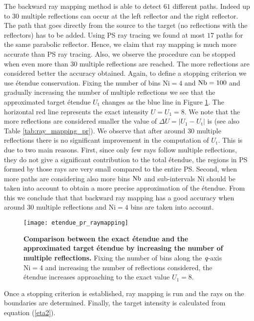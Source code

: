 The backward ray mapping method is able to detect $61$ different paths. Indeed up to $30$ multiple reflections can occur at the left reflector and the right reflector. The path that goes directly from the source to the target (no reflections with the reflectors) has to be added. Using PS ray tracing we found at most $17$ paths for the same parabolic reflector. Hence, we claim that ray mapping is much more accurate than PS ray tracing. Also, we observe the procedure can be stopped when even more than $30$ multiple reflections are reached. The more reflections are considered better the accuracy obtained. Again, to define a stopping criterion we use \'{e}tendue conservation. Fixing the number of bins $\textrm{Ni}=4$ and $\textrm{Nb}=100$ and gradually increasing the number of multiple reflections we see that the approximated target \'{e}tendue $U_{\textrm{t}}$ changes as the blue line in Figure \ref{fig:etendue_pr_raymapping}. The horizontal red line represents the exact intensity $U = U_{1} = 8$. We note that the more reflections are considered smaller the value of $\Delta U = |U_1-U_{\textrm{t}}|$ is (see also Table \ref{tab:ray_mapping_pr}). We observe that after around $30$ multiple reflections there is no significant improvement in the computation of $U_{\textrm{t}}$. This is due to two main reasons. First, since only few rays follow multiple reflections, they do not give a significant contribution to the total \'{e}tendue, the regions in PS formed by those rays are very small compared to the entire PS. Second, when more paths are considering also more bins $\textrm{Nb}$ and sub-intervals $\textrm{Ni}$ should be taken into account to obtain a more precise approximation of the \'{e}tendue. From this we conclude that that backward ray mapping has a good accuracy when around $30$ multiple reflections and $\textrm{Ni}=4$ bins are taken into account.
\begin{figure}[h]
  \begin{center}
  \texttt{[image: etendue\_pr\_raymapping]}
  \end{center}
  \caption{\textbf{Comparison between the exact \'{e}tendue and the approximated target \'{e}tendue by increasing the number of multiple reflections.}
Fixing the number of bins along the $\textit{q}$-axis $\textrm{Ni}=4$ and increasing the number of reflections considered, the \'{e}tendue increases approaching to the exact value $U_1=8$.}
\label{fig:etendue_pr_raymapping}
 \end{figure}
Once a stopping criterion is established, ray mapping is run and the rays on the boundaries are determined. Finally, the target intensity is calculated from equation (\ref{eta2}). 
